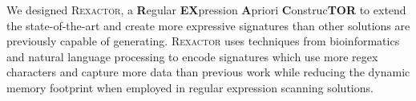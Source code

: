 We designed \textsc{Rexactor}, a \textbf{R}egular \textbf{EX}pression \textbf{A}priori \textbf{C}onstruc\textbf{TOR} to extend the state-of-the-art and create more expressive signatures than other solutions are previously capable of generating. \textsc{Rexactor} uses techniques from bioinformatics and natural language processing to encode signatures which use more regex characters and capture more data than previous work while reducing the dynamic memory footprint when employed in regular expression scanning solutions.
